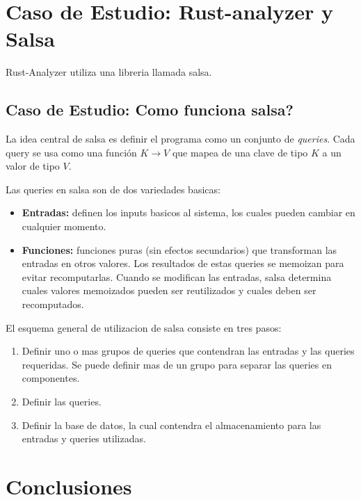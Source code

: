 \documentclass[12pt, a4paper]{report}
\begin{document}
\section*{Caso de Estudio: Rust-analyzer y Salsa}

Rust-Analyzer utiliza una libreria llamada salsa.

\subsection*{Caso de Estudio: Como funciona salsa?}

La idea central de salsa es definir el programa como un conjunto de \textit{queries}.
Cada query se usa como una función $K \to V$ que mapea de una clave de tipo $K$ a un valor de tipo $V$.

Las queries en salsa son de dos variedades basicas:
\begin{itemize}[noitemsep]
\item \textbf{Entradas:}
definen los inputs basicos al sistema, los cuales pueden cambiar en cualquier momento.
\item \textbf{Funciones:}
funciones puras (sin efectos secundarios) que transforman las entradas en otros valores.
Los resultados de estas queries se memoizan para evitar recomputarlas.
Cuando se modifican las entradas, salsa determina cuales valores memoizados pueden ser reutilizados y cuales deben ser recomputados.
\end{itemize}

El esquema general de utilizacion de salsa consiste en tres pasos:

\begin{enumerate}[noitemsep]
\item Definir uno o mas grupos de queries que contendran las entradas y las queries requeridas.
Se puede definir mas de un grupo para separar las queries en componentes.
\item Definir las queries.
\item Definir la base de datos, la cual contendra el almacenamiento para las entradas y queries utilizadas.
\end{enumerate}

\section*{Conclusiones}
\end{document}

